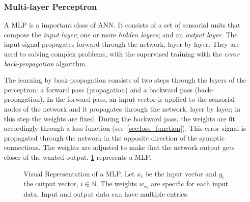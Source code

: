 \subsubsection*{Multi-layer Perceptron}

A MLP is a important class of ANN. It consists of a set of sensorial units that compose the \emph{input layer}; one or more \emph{hidden layers}; and an \emph{output layer}. 
The input signal propagates forward through the network, layer by layer. 
They are used to solving complex problems, with the supervised training with the \emph{error back-propagation} algorithm.

The learning by back-propagation consists of two steps through the layers of the perceptron: a forward pass (propagation) and a backward pass (back-propagation). 
In the forward pass, an input vector is applied to the sensorial nodes of the network and it propagates through the network, layer by layer; in this step the weights are fixed. 
During the backward pass, the weights are fit accordingly through a loss function (see~\cref{sec:loss_function}). 
This error signal is propagated through the network in the opposite direction of the synaptic connections. 
The weights are adjusted to make that the network output gets closer of the wanted output. 
\cref{fig:mlp} represents a MLP.

\begin{figure}[!htb]
    \centering
    \caption[Visual Representation of a MLP]{Visual Representation of a MLP. Let \(x_i\) be the input vector and \(y_i\) the output vector, \(i \in \mathbb{N}\). The weights \(w_{x_i}\) are specific for each input data. Input and output data can have multiple entries.}
    
    
    \label{fig:mlp}
\end{figure}

